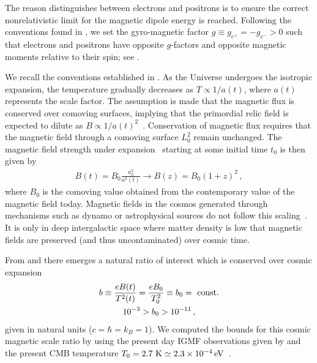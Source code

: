 The reason  distinguishes between electrons and positrons is to ensure the correct nonrelativistic limit for the magnetic dipole energy is reached. Following the conventions found in \cite{Tiesinga:2021myr}, we set the gyro-magnetic factor $g\equiv g_{e^{+}}=-g_{e^{-}}>0$ such that electrons and positrons have opposite $g$-factors and opposite magnetic moments relative to their spin; see .

We recall the conventions established in . As the Universe undergoes the isotropic expansion, the temperature gradually decreases as $T\propto1/a(t)$, where $a(t)$ represents the scale factor. The assumption is made that the magnetic flux is conserved over comoving surfaces, implying that the primordial relic field is expected to dilute as $B\propto1/a(t)^{2}$~\cite{Rafelski:2023emw}. Conservation of magnetic flux requires that the magnetic field through a comoving surface $L_{0}^{2}$ remain unchanged. The magnetic field strength under expansion~\cite{Durrer:2013pga} starting at some initial time $t_{0}$ is then given by
\begin{gather}
 \label{bscale}
 B(t)=B_{0}\frac{a^{2}_{0}}{a^{2}(t)}\rightarrow B(z)=B_{0}\left(1+z\right)^{2}\,,
\end{gather}
where $B_{0}$ is the comoving value obtained from the contemporary value of the magnetic field today. Magnetic fields in the cosmos generated through mechanisms such as dynamo or astrophysical sources do not follow this scaling~\cite{Pomakov:2022cem}. It is only in deep intergalactic space where matter density is low that magnetic fields are preserved (and thus uncontaminated) over cosmic time.

From  and  there emerges a natural ratio of interest which is conserved over cosmic expansion 
\begin{gather}
 \label{tbscale}
 b\equiv\frac{e{B}(t)}{T^{2}(t)}=\frac{e{B}_{0}}{T_{0}^{2}}\equiv b_0={\rm\ const.}\\
 10^{-3}>b_{0}>10^{-11}\,,
\end{gather}
given in natural units ($c=\hbar=k_{B}=1$). We computed the bounds for this cosmic magnetic scale ratio by using the present day IGMF observations given by  and the present CMB temperature $T_{0}=2.7{\rm\ K}\simeq2.3\times10^{-4}\eV$~\cite{Planck:2018vyg}.

